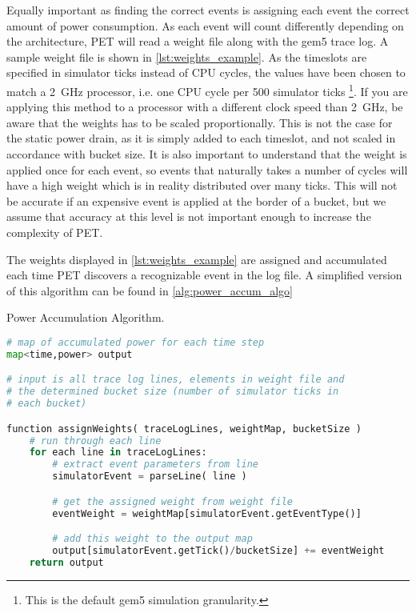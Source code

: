 Equally important as finding the correct events is assigning each event the
correct amount of power consumption. As each event will count differently
depending on the architecture, PET will read a weight file along with the gem5
trace log. A sample weight file is shown in \autoref{lst:weights_example}. As
the timeslots are specified in simulator ticks instead of CPU cycles, the values
have been chosen to match a 2~GHz processor, i.e. one CPU cycle per 500
simulator ticks \footnote{This is the default gem5 simulation granularity.}.
If you are applying this method to a processor with a different clock speed than
2~GHz, be aware that the weights has to be scaled proportionally. This is not
the case for the static power drain, as it is simply added to each timeslot, and
not scaled in accordance with bucket size. It is also important to understand
that the weight is applied once for each event, so events that naturally takes a
number of cycles will have a high weight which is in reality distributed over
many ticks. This will not be accurate if an expensive event is applied at the
border of a bucket, but we assume that accuracy at this level is not important
enough to increase the complexity of PET.



The weights displayed in \autoref{lst:weights_example} are assigned and
accumulated each time PET discovers a recognizable event in the log file. A
simplified version of this algorithm can be found in
\autoref{alg:power_accum_algo}

\begin{algorithm}
\caption{Power Accumulation Algorithm.}
\label{alg:power_accum_algo}
\begin{lstlisting}[language=Python,style=algo]
# map of accumulated power for each time step
map<time,power> output

# input is all trace log lines, elements in weight file and
# the determined bucket size (number of simulator ticks in
# each bucket)

function assignWeights( traceLogLines, weightMap, bucketSize )
    # run through each line
    for each line in traceLogLines:
        # extract event parameters from line
        simulatorEvent = parseLine( line )

        # get the assigned weight from weight file
        eventWeight = weightMap[simulatorEvent.getEventType()]

        # add this weight to the output map
        output[simulatorEvent.getTick()/bucketSize] += eventWeight
    return output
\end{lstlisting}
\end{algorithm}

